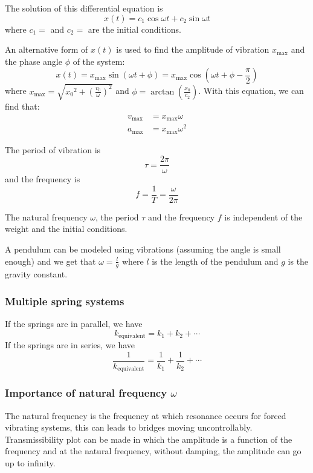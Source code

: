 \documentclass[10pt, twocolumn]{article}
\begin{document}
The solution of this differential equation is
\[
  x(t) = c_1\cos{\omega t} + c_2\sin{\omega t}
\]
where \(c_1 = \) and \(c_2 = \) are the initial conditions.

An alternative form of \(x(t)\) is used to find the amplitude of vibration \(x_\mathrm{max}\) and the phase angle \(\phi\) of the system:
\[
  x(t) = x_\mathrm{max}\sin(\omega t + \phi) = x_\mathrm{max}\cos(\omega t + \phi - \frac{\pi}{2})
\]
where \(x_\mathrm{max} = \sqrt{{x_0}^2 + \left( \frac{v_0}{\omega} \right)^2 }\) and \(\phi = \arctan\left( \frac{x_0}{c_2} \right)\).
With this equation, we can find that:
\begin{align*}
  v_\mathrm{max} & = x_\mathrm{max} \omega   \\
  a_\mathrm{max} & = x_\mathrm{max} \omega^2
\end{align*}

The period of vibration is
\[
  \tau = \frac{2\pi}{\omega}
\]
and the frequency is
\[
  f = \frac{1}{T} = \frac{\omega}{2\pi}
\]

\begin{remark}
  The natural frequency \(\omega\), the period \(\tau\) and the frequency \(f\) is independent of the weight and the initial conditions.
\end{remark}


\begin{example}
  A pendulum can be modeled using vibrations (assuming the angle is small enough) and we get that \(\omega = \frac{l}{g}\) where \(l\) is the length of the pendulum and \(g\) is the gravity constant.
\end{example}


\subsubsection{Multiple spring systems}
If the springs are in parallel, we have
\[
  k_{\mathrm{equivalent}} = k_1 + k_2 + \cdots
\]
If the springs are in series, we have
\[
  \frac{1}{k_{\mathrm{equivalent}}} = \frac{1}{k_1}+ \frac{1}{k_2} + \cdots
\]


\subsubsection{Importance of natural frequency \(\omega\)}
The natural frequency is the frequency at which resonance occurs for forced vibrating systems, this can leads to bridges moving uncontrollably.
Transmissibility plot can be made in which the amplitude is a function of the frequency and at the natural frequency, without damping, the amplitude can go up to infinity.
\end{document}
